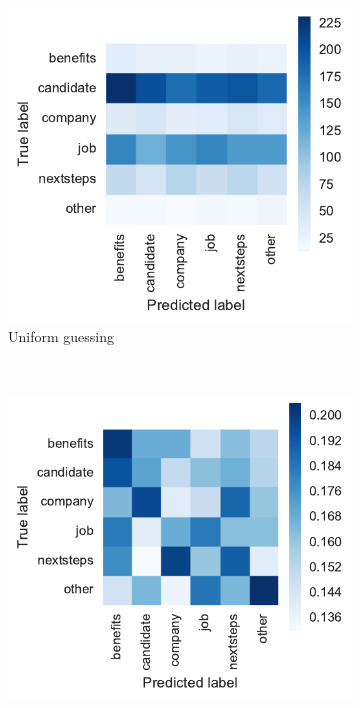 \begin{figure}
    \centering
    \begin{subfigure}[b]{0.47\textwidth}
        \includegraphics[width=\textwidth]{img/exp-vector-space/guessing-conf-matrix-uniform.pdf}
        \caption{Uniform guessing}
\label{fig:guessing-conf-matrix-uniform}
    \end{subfigure}
~\begin{subfigure}[b]{0.48\textwidth}
        \includegraphics[width=\textwidth]{img/exp-vector-space/guessing-conf-matrix-uniform-normalized.pdf}

\end{subfigure}
\end{figure}
